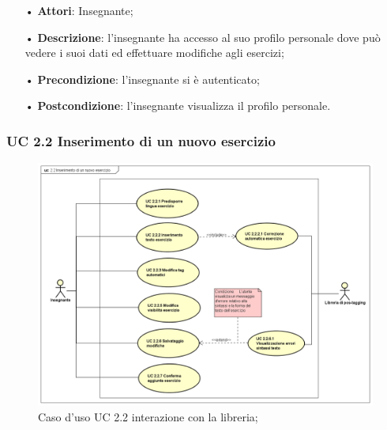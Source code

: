
\begin{itemize}
	\item[•] \textbf{Attori}: Insegnante;
	\item[•] \textbf{Descrizione}: l’insegnante ha accesso al suo profilo personale dove può vedere i suoi dati ed effettuare modifiche agli esercizi;

	\item[•] \textbf{Precondizione}: l'insegnante si è autenticato;

	\item[•] \textbf{Postcondizione}: l'insegnante visualizza il profilo personale.

\end{itemize}


\subsubsection{UC 2.2 Inserimento di un nuovo esercizio}

\begin{figure}[H]
	\centering
	\includegraphics[width=17cm]{img/UC22LIBRERIA.png} 
	\caption{Caso d'uso UC 2.2 interazione con la libreria;}
\end{figure}


